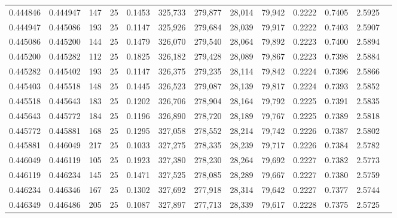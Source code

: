\begin{tabular}{rrrrrrrrrrrrr}
0.444846 & 0.444947 &   147 &  25 &                                     0.1453 & 325,733 & 279,877 &  28,014 &  79,942 & 0.2222 & 0.7405 & 2.5925 \\
0.444947 & 0.445086 &   193 &  25 &                                     0.1147 & 325,926 & 279,684 &  28,039 &  79,917 & 0.2222 & 0.7403 & 2.5907 \\
0.445086 & 0.445200 &   144 &  25 &                                     0.1479 & 326,070 & 279,540 &  28,064 &  79,892 & 0.2223 & 0.7400 & 2.5894 \\
0.445200 & 0.445282 &   112 &  25 &                                     0.1825 & 326,182 & 279,428 &  28,089 &  79,867 & 0.2223 & 0.7398 & 2.5884 \\
0.445282 & 0.445402 &   193 &  25 &                                     0.1147 & 326,375 & 279,235 &  28,114 &  79,842 & 0.2224 & 0.7396 & 2.5866 \\
0.445403 & 0.445518 &   148 &  25 &                                     0.1445 & 326,523 & 279,087 &  28,139 &  79,817 & 0.2224 & 0.7393 & 2.5852 \\
0.445518 & 0.445643 &   183 &  25 &                                     0.1202 & 326,706 & 278,904 &  28,164 &  79,792 & 0.2225 & 0.7391 & 2.5835 \\
0.445643 & 0.445772 &   184 &  25 &                                     0.1196 & 326,890 & 278,720 &  28,189 &  79,767 & 0.2225 & 0.7389 & 2.5818 \\
0.445772 & 0.445881 &   168 &  25 &                                     0.1295 & 327,058 & 278,552 &  28,214 &  79,742 & 0.2226 & 0.7387 & 2.5802 \\
0.445881 & 0.446049 &   217 &  25 &                                     0.1033 & 327,275 & 278,335 &  28,239 &  79,717 & 0.2226 & 0.7384 & 2.5782 \\
0.446049 & 0.446119 &   105 &  25 &                                     0.1923 & 327,380 & 278,230 &  28,264 &  79,692 & 0.2227 & 0.7382 & 2.5773 \\
0.446119 & 0.446234 &   145 &  25 &                                     0.1471 & 327,525 & 278,085 &  28,289 &  79,667 & 0.2227 & 0.7380 & 2.5759 \\
0.446234 & 0.446346 &   167 &  25 &                                     0.1302 & 327,692 & 277,918 &  28,314 &  79,642 & 0.2227 & 0.7377 & 2.5744 \\
0.446349 & 0.446486 &   205 &  25 &                                     0.1087 & 327,897 & 277,713 &  28,339 &  79,617 & 0.2228 & 0.7375 & 2.5725 \\

\end{tabular}
